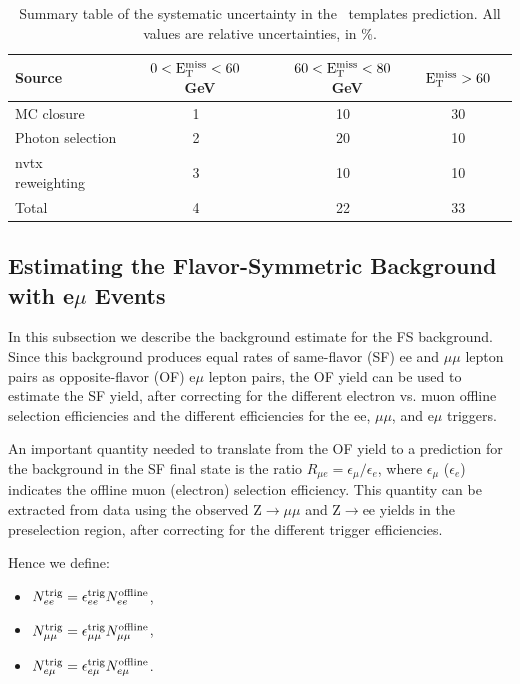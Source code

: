 \begin{table}[htb]
\scriptsize
\begin{center}
\caption{\label{table:photonsystematicssummary} Summary table of the systematic uncertainty in the \MET\ templates prediction.
All values are relative uncertainties, in \%.
}
\begin{tabular}{l|c|c|c|c}
\hline
\hline
Source               & $0 < \rm{E_{T}^{miss}} < 60$~GeV     & $60 < \rm{E_{T}^{miss}} < 80$~GeV  & $\rm{E_{T}^{miss}} > 60$ \\ 
\hline
MC closure           &           1             &        10             &     30      \\
Photon selection     &           2             &        20             &     10      \\
nvtx reweighting     &           3             &        10             &     10      \\
\hline
Total                &           4             &        22             &     33      \\
\hline
\hline
\end{tabular}
\end{center}
\end{table} 


\subsection{Estimating the Flavor-Symmetric Background with e$\mu$ Events}
\label{sec:bkg_fs}

In this subsection we describe the background estimate for the FS background. Since this background produces equal rates of same-flavor (SF)
ee and $\mu\mu$ lepton pairs as opposite-flavor (OF) e$\mu$ lepton pairs, the OF yield can be used to estimate the SF yield, after
correcting for the different electron vs. muon offline selection efficiencies and the different efficiencies for the ee, $\mu\mu$, and e$\mu$ triggers.

An important quantity needed to translate from the OF yield to a prediction for the background in the SF final state is the ratio 
$R_{\mu e} = \epsilon_\mu / \epsilon_e$, where $\epsilon_\mu$ ($\epsilon_e$) indicates the offline muon (electron) selection efficiency. 
This quantity can be extracted from data using the observed Z$\to\mu\mu$ and Z$\to$ee yields in the preselection region, after correcting 
for the different trigger efficiencies.

Hence we define:

\begin{itemize}
\item $N_{ee}^{\rm{trig}} = \epsilon_{ee}^{\rm{trig}}N_{ee}^{\rm{offline}}$,
\item $N_{\mu\mu}^{\rm{trig}} = \epsilon_{\mu\mu}^{\rm{trig}}N_{\mu\mu}^{\rm{offline}}$,
\item $N_{e\mu}^{\rm{trig}} = \epsilon_{e\mu}^{\rm{trig}}N_{e\mu}^{\rm{offline}}$.
\end{itemize}
 

